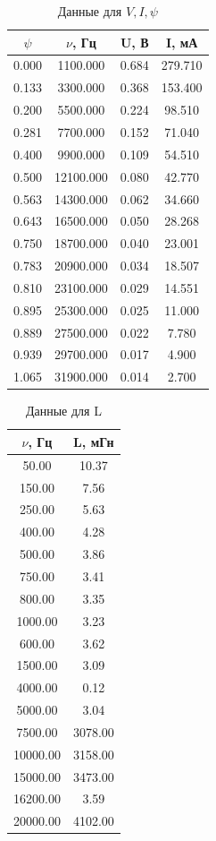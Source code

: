 \documentclass[a4paper, 12pt]{article}
\begin{document}
\begin{table}[H]
	\centering
	\begin{tabular}{|c|c|c|c|}
	\hline
	$\psi$ & $\nu$, Гц & U, В  & I, мА   \\ \hline
	0.000  & 1100.000  & 0.684 & 279.710 \\ \hline
	0.133  & 3300.000  & 0.368 & 153.400 \\ \hline
	0.200  & 5500.000  & 0.224 & 98.510  \\ \hline
	0.281  & 7700.000  & 0.152 & 71.040  \\ \hline
	0.400  & 9900.000  & 0.109 & 54.510  \\ \hline
	0.500  & 12100.000 & 0.080 & 42.770  \\ \hline
	0.563  & 14300.000 & 0.062 & 34.660  \\ \hline
	0.643  & 16500.000 & 0.050 & 28.268  \\ \hline
	0.750  & 18700.000 & 0.040 & 23.001  \\ \hline
	0.783  & 20900.000 & 0.034 & 18.507  \\ \hline
	0.810  & 23100.000 & 0.029 & 14.551  \\ \hline
	0.895  & 25300.000 & 0.025 & 11.000  \\ \hline
	0.889  & 27500.000 & 0.022 & 7.780   \\ \hline
	0.939  & 29700.000 & 0.017 & 4.900   \\ \hline
	1.065  & 31900.000 & 0.014 & 2.700   \\ \hline
	\end{tabular}
	\caption{Данные для $V, I, \psi$}
	\label{tab:3}
	\end{table}

\begin{table}[H]
\centering
\begin{tabular}{|c|c|}
\hline
$\nu$, Гц & L, мГн  \\ \hline
50.00     & 10.37   \\ \hline
150.00    & 7.56    \\ \hline
250.00    & 5.63    \\ \hline
400.00    & 4.28    \\ \hline
500.00    & 3.86    \\ \hline
750.00    & 3.41    \\ \hline
800.00    & 3.35    \\ \hline
1000.00   & 3.23    \\ \hline
600.00    & 3.62    \\ \hline
1500.00   & 3.09    \\ \hline
4000.00   & 0.12    \\ \hline
5000.00   & 3.04    \\ \hline
7500.00   & 3078.00 \\ \hline
10000.00  & 3158.00 \\ \hline
15000.00  & 3473.00 \\ \hline
16200.00  & 3.59    \\ \hline
20000.00  & 4102.00 \\ \hline
\end{tabular}
\caption{Данные для L}
\label{tab:4}
\end{table}
\end{document}

